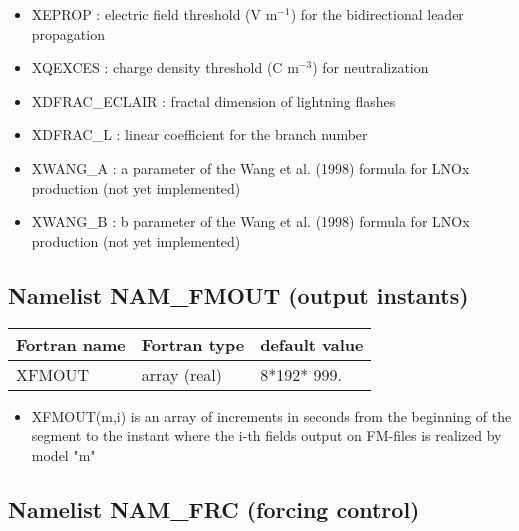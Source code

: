 \begin{itemize}
  \item XEPROP : electric field threshold (V m$^{-1}$) for the bidirectional leader propagation
  \item XQEXCES : charge density threshold (C m$^{-3}$) for neutralization
  \item XDFRAC\_ECLAIR : fractal dimension of lightning flashes
  \item XDFRAC\_L : linear coefficient for the branch number
  \item XWANG\_A : a parameter of the Wang et al. (1998) formula for LNOx production (not yet implemented)
  \item XWANG\_B : b parameter of the Wang et al. (1998) formula for LNOx production (not yet implemented)
\end{itemize}

\subsection{Namelist NAM\_FMOUT (output instants)}

\begin{center}
\begin{tabular} {|l|l|l|}
\hline
Fortran name & Fortran type & default value \\
\hline
XFMOUT  &  array (real) &  8*192* 999.   \\
\hline
\end{tabular}
\end{center}

\begin{itemize}
\item
{} 
XFMOUT(m,i) is an array of increments in seconds from the beginning
of the segment to the instant where the i-th fields output on FM-files
is realized by model "m"

\end{itemize}

\subsection{Namelist NAM\_FRC (forcing control)}

